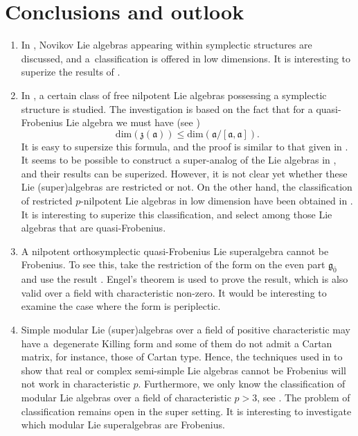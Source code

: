 \documentclass[10pt,a4paper]{amsart}
\numberwithin{equation}{section}
\begin{document}
\section{Conclusions and outlook}
\begin{enumerate}\itemsep=0pt
 \item[(1)] In \cite{AM}, Novikov Lie algebras appearing within symplectic structures are discussed, and a~classification is offered in low dimensions. It is interesting to superize the results of \cite{AM}.

 \item[(2)] In \cite{D}, a certain class of free nilpotent Lie algebras possessing a symplectic structure is studied. The investigation is based on the fact that for a quasi-Frobenius Lie algebra we must have (see \cite{BC})
\[
\mathrm{dim}(\mathfrak{z}(\mathfrak{a}))\leq \mathrm{dim}( \mathfrak{a}/[\mathfrak{a}, \mathfrak{a}]).
\]
It is easy to supersize this formula, and the proof is similar to that given in \cite{BC}. It seems to be possible to construct a super-analog of the Lie algebras in \cite{D}, and their results can be superized. However, it is not clear yet whether these Lie (super)algebras are restricted or not.
On the other hand, the classification of restricted $p$-nilpotent Lie algebras in low dimension have been obtained in \cite{DU, MS}. It is interesting to superize this classification, and select among those Lie algebras that are quasi-Frobenius.

 \item[(3)] A nilpotent orthosymplectic quasi-Frobenius Lie superalgebra cannot be Frobenius. To see this, take the restriction of the form on the even part ${\mathfrak g}_{{\bar 0}}$ and use the result \cite[Proposition~6]{GR}. Engel's theorem is used to prove the result, which is also valid over a field with characteristic non-zero. It would be interesting to examine the case where the form is periplectic.

 \item[(4)] Simple modular Lie (super)algebras over a field of positive characteristic may have a~degenerate Killing form and some of them do not admit a Cartan matrix, for instance, those of Cartan type. Hence, the techniques used in \cite{GR} to show that real or complex semi-simple Lie algebras cannot be Frobenius will not work in characteristic $p$. Furthermore, we only know the classification of modular Lie algebras over a field of characteristic $p>3$, see \cite{S2}. The problem of classification remains open in the super setting. It is interesting to investigate which modular Lie superalgebras are Frobenius.


\end{enumerate}
\end{document}
